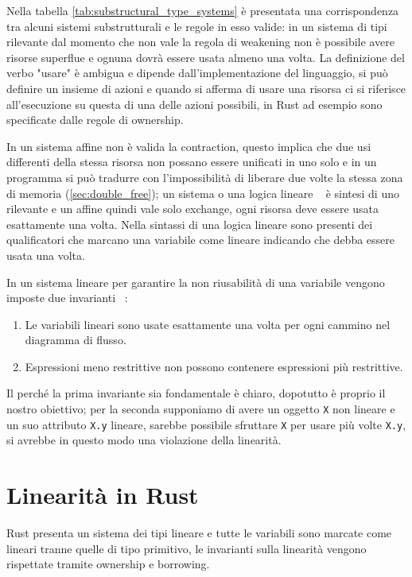 \documentclass[Lau,binding=0.6cm]{sapthesis}
\begin{document}
Nella tabella \ref{tab:substructural_type_systems} è presentata una corrispondenza tra alcuni sistemi substrutturali e le regole in esso valide: in un sistema di tipi rilevante dal momento che non vale la regola di weakening non è possibile avere risorse superflue e ognuna dovrà essere usata almeno una volta. 
La definizione del verbo "usare" è ambigua e dipende dall'implementazione del linguaggio, si può definire un insieme di azioni e quando si afferma di usare una risorsa ci si riferisce all'esecuzione su questa di una delle azioni possibili, in Rust ad esempio sono specificate dalle regole di ownership.

In un sistema affine non è valida la contraction, questo implica che due usi differenti della stessa risorsa non possano essere unificati in uno solo e in un programma si può tradurre con l'impossibilità di liberare due volte la stessa zona di memoria (\ref{sec:double_free}); un sistema o una logica lineare ~\cite{girard:linear_logic} è sintesi di uno rilevante e un affine quindi vale solo exchange, ogni risorsa deve essere usata esattamente una volta.
Nella sintassi di una logica lineare sono presenti dei qualificatori che marcano una variabile come lineare indicando che debba essere usata una volta.

In un sistema lineare per garantire la non riusabilità di una variabile vengono imposte due invarianti ~\cite{walker:linear_logic}:

\begin{enumerate}
    \item Le variabili lineari sono usate esattamente una volta per ogni cammino nel diagramma di flusso.
    \item Espressioni meno restrittive non possono contenere espressioni più restrittive. 
\end{enumerate}

Il perché la prima invariante sia fondamentale è chiaro, dopotutto è proprio il nostro obiettivo; per la seconda supponiamo di avere un oggetto \texttt{X} non lineare e un suo attributo \texttt{X.y} lineare, sarebbe possibile sfruttare \texttt{X} per usare più volte \texttt{X.y}, si avrebbe in questo modo una violazione della linearità. 

\section{Linearità in Rust}

Rust presenta un sistema dei tipi lineare e tutte le variabili sono marcate come lineari tranne quelle di tipo primitivo, le invarianti sulla linearità vengono rispettate tramite ownership e borrowing.
\end{document}
